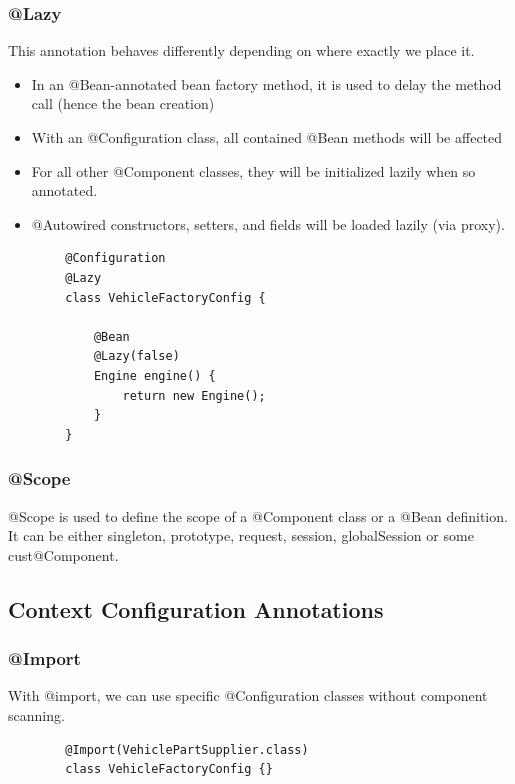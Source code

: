 \documentclass{scrartcl}
\begin{document}
\subsubsection{@Lazy}

    This annotation behaves differently depending on where exactly we place it.

    \begin{itemize}
        \item In an @Bean-annotated bean factory method, it is used to delay the method call (hence the bean creation)
        \item With an @Configuration class, all contained @Bean methods will be affected
        \item For all other @Component classes,  they will be initialized lazily when so annotated.
        \item @Autowired constructors, setters, and fields will be loaded lazily (via proxy).
    \end{itemize}

    \begin{lstlisting}
        @Configuration
        @Lazy
        class VehicleFactoryConfig {

            @Bean
            @Lazy(false)
            Engine engine() {
                return new Engine();
            }
        }
    \end{lstlisting}

\subsubsection{@Scope}

    @Scope is used to define the scope of a @Component class or a @Bean definition. It can be either singleton, prototype, request, session, globalSession or some cust@Component.

\subsection{Context Configuration Annotations}

\subsubsection{@Import}

    With @import, we can use specific @Configuration classes without component scanning.

    \begin{lstlisting}
        @Import(VehiclePartSupplier.class)
        class VehicleFactoryConfig {}
    \end{lstlisting}
\end{document}
